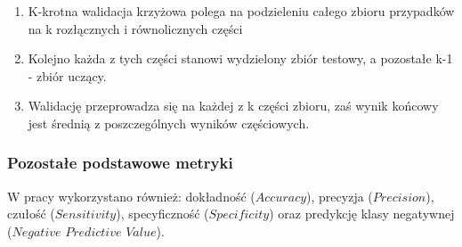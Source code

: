 \begin{enumerate}
    \item K-krotna walidacja krzyżowa polega na podzieleniu całego zbioru przypadków na k
rozłącznych i równolicznych części
    \item Kolejno każda z tych części stanowi wydzielony zbiór testowy, a pozostałe k-1 - zbiór uczący.
    \item Walidację przeprowadza się na każdej z k części zbioru, zaś wynik końcowy jest średnią z poszczególnych wyników częściowych.
\end{enumerate}

\subsubsection{Pozostałe podstawowe metryki}
W pracy wykorzystano również: dokładność ($Accuracy$), precyzja ($Precision$), czułość ($Sensitivity$), specyficzność ($Specificity$) oraz predykcję klasy negatywnej ($Negative$ $Predictive$ $Value$). 